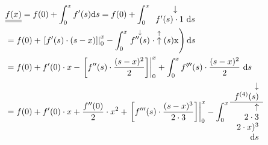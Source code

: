\documentclass[10pt]{article}
\begin{document}
$$
\begin{aligned}
& \underline{\underline{f(x)}}=f(0)+\int_{0}^{x} f^{\prime}(s) \mathrm{d} s=f(0)+\int_{0}^{x} \begin{array}{c}
\downarrow \\
f^{\prime}(s) \cdot 1 \mathrm{~d} s
\end{array} \\
& \left.=f(0)+\left.\left[f^{\prime}(s) \cdot(s-x)\right]\right|_{0} ^{x}-\int_{0}^{x} \stackrel{\downarrow}{f^{\prime \prime}(s)} \cdot \stackrel{\uparrow}{\uparrow}(s) \mathrm{x}\right) \mathrm{d} s \\
& =f(0)+f^{\prime}(0) \cdot x-\left.\left[f^{\prime \prime}(s) \cdot \frac{(s-x)^{2}}{2}\right]\right|_{0} ^{x}+\int_{0}^{x} f^{\not \prime \prime \prime}(s) \cdot \frac{(s-x)^{2}}{2} \mathrm{~d} s \\
& =f(0)+f^{\prime}(0) \cdot x+\frac{f^{\prime \prime}(0)}{2} \cdot x^{2}+\left.\left[f^{\prime \prime \prime}(s) \cdot \frac{(s-x)^{3}}{2 \cdot 3}\right]\right|_{0} ^{x}-\int_{0}^{x} \begin{array}{r}
\downarrow \\
f^{(4)}(s) \\
\hline \uparrow \\
2 \cdot 3 \\
2 \cdot x)^{3} \\
\mathrm{~d} s
\end{array}
\end{aligned}
$$
\end{document}
